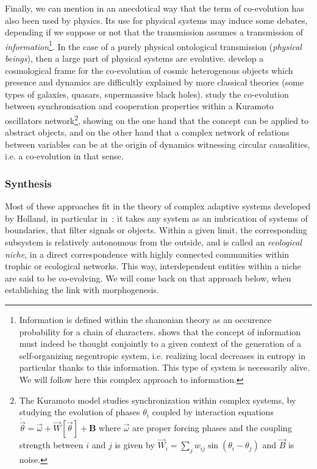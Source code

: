 \documentclass[letterpaper]{article}
\begin{document}
Finally, we can mention in an anecdotical way that the term of co-evolution has also been used by physics. Its use for physical systems may induce some debates, depending if we suppose or not that the transmission assumes a transmission of \emph{information}\footnote{Information is defined within the shanonian theory as an occurence probability for a chain of characters. \cite{morin1976methode} shows that the concept of information must indeed be thought conjointly to a given context of the generation of a self-organizing negentropic system, i.e. realizing local decreases in entropy in particular thanks to this information. This type of system is necessarily alive. We will follow here this complex approach to information.}. In the case of a purely physical ontological transmission (\emph{physical beings}), then a large part of physical systems are evolutive. \cite{hopkins2008cosmological} develop a cosmological frame for the co-evolution of cosmic heterogenous objects which presence and dynamics are difficultly explained by more classical theories (some types of galaxies, quasars, supermassive black holes). \cite{antonioni2017coevolution} study the co-evolution between synchronisation and cooperation properties within a Kuramoto oscillators network\footnote{The Kuramoto model studies synchronization within complex systems, by studying the evolution of phases $\theta_i$ coupled by interaction equations $\dot{\vec{\theta}} = \vec{\omega} + \vec{W}\left[\vec{\theta}\right] + \mathbf{B}$ where $\vec{\omega}$ are proper forcing phases and the coupling strength between $i$ and $j$ is given by $\vec{W}_{i} = \sum_j w_{ij} \sin\left(\theta_i - \theta_j\right)$ and $\vec{B}$ is noise.}, showing on the one hand that the concept can be applied to abstract objects, and on the other hand that a complex network of relations between variables can be at the origin of dynamics witnessing circular causalities, i.e. a co-evolution in that sense.


\subsubsection{Synthesis}

Most of these approaches fit in the theory of complex adaptive systems developed by Holland, in particular in~\cite{holland2012signals}: it takes any system as an imbrication of systems of boundaries, that filter signals or objects. Within a given limit, the corresponding subsystem is relatively autonomous from the outside, and is called an \emph{ecological niche}, in a direct correspondence with highly connected communities within trophic or ecological networks. This way, interdependent entities within a niche are said to be co-evolving. We will come back on that approach below, when establishing the link with morphogenesis.
\end{document}
